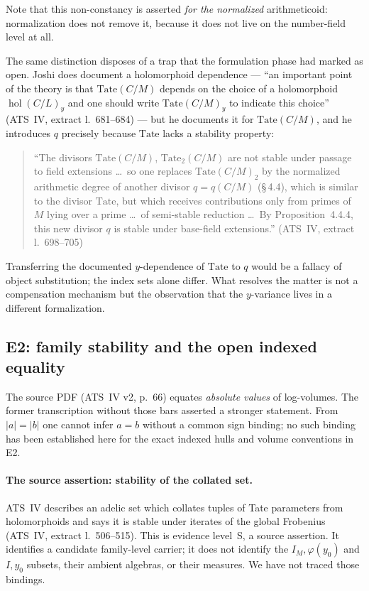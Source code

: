 \documentclass[11pt,a4paper]{article}
\theoremstyle{definition}
\theoremstyle{plain}
\theoremstyle{definition}
\newcommand{\hol}{\operatorname{hol}}
\newcommand{\anchor}[2]{(#1, extract l.~#2)}
\begin{document}
Note that this non-constancy is asserted \emph{for the normalized} arithmeticoid:
normalization does not remove it, because it does not live on the number-field
level at all.

The same distinction disposes of a trap that the formulation phase had marked as
open. Joshi does document a holomorphoid dependence --- ``an important point of
the theory is that $\mathrm{Tate}(C/M)$ depends on the choice of a holomorphoid
$\hol(C/L)_y$ and one should write $\mathrm{Tate}(C/M)_y$ to indicate this
choice'' \anchor{ATS~IV}{681--684} --- but he documents it for
$\mathrm{Tate}(C/M)$, and he introduces $q$ precisely because $\mathrm{Tate}$
lacks a stability property:

\begin{quote}\small
``The divisors $\mathrm{Tate}(C/M)$, $\mathrm{Tate}_2(C/M)$ are not stable under
passage to field extensions \ldots\ so one replaces $\mathrm{Tate}(C/M)_2$ by the
normalized arithmetic degree of another divisor $q = q(C/M)$ (\S\,4.4), which is
similar to the divisor $\mathrm{Tate}$, but which receives contributions only from
primes of $M$ lying over a prime \ldots\ of semi-stable reduction \ldots\ By
Proposition~4.4.4, this new divisor $q$ is stable under base-field extensions.''
\hfill\anchor{ATS~IV}{698--705}
\end{quote}

Transferring the documented $y$-dependence of $\mathrm{Tate}$ to $q$ would be a
fallacy of object substitution; the index sets alone differ. What resolves the
matter is not a compensation mechanism but the observation that the $y$-variance
lives in a different formalization.

\subsection{E2: family stability and the open indexed equality}
The source PDF (ATS~IV v2, p.~66) equates \emph{absolute values} of
log-volumes. The former transcription without those bars asserted a stronger
statement. From $|a|=|b|$ one cannot infer $a=b$ without a common sign
binding; no such binding has been established here for the exact indexed hulls
and volume conventions in E2.

\paragraph{The source assertion: stability of the collated set.}
ATS~IV describes an adelic set which collates tuples of Tate parameters from
holomorphoids and says it is stable under iterates of the global Frobenius
\anchor{ATS~IV}{506--515}. This is evidence level~S, a source assertion.
It identifies a candidate family-level carrier; it does not identify the
$I_M,\varphi(y_0)$ and $I,y_0$ subsets, their ambient algebras, or their
measures. We have not traced those bindings.
\end{document}
